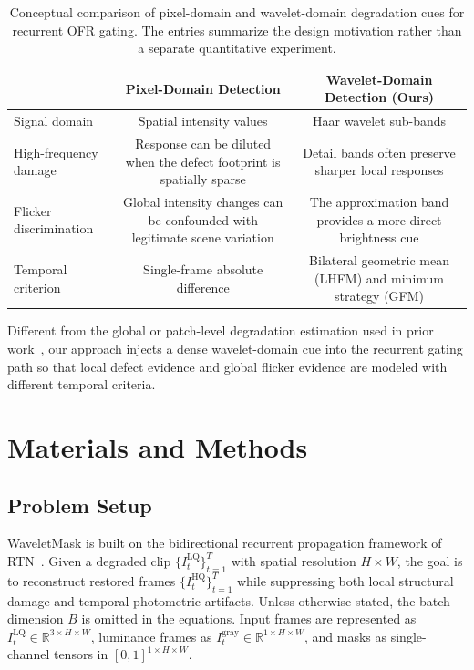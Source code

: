 \documentclass[applsci,article,submit,pdftex,moreauthors]{Definitions/mdpi}
\begin{document}
\begin{table}[H]
\caption{Conceptual comparison of pixel-domain and wavelet-domain degradation cues for recurrent OFR gating. The entries summarize the design motivation rather than a separate quantitative experiment.\label{tab:feature_comparison}}
\begin{tabularx}{\textwidth}{lCC}
\toprule
& \textbf{Pixel-Domain Detection} & \textbf{Wavelet-Domain Detection (Ours)} \\
\midrule
Signal domain          & Spatial intensity values & Haar wavelet sub-bands \\
High-frequency damage  & Response can be diluted when the defect footprint is spatially sparse & Detail bands often preserve sharper local responses \\
Flicker discrimination & Global intensity changes can be confounded with legitimate scene variation & The approximation band provides a more direct brightness cue \\
Temporal criterion     & Single-frame absolute difference & Bilateral geometric mean (LHFM) and minimum strategy (GFM) \\
\bottomrule
\end{tabularx}
\end{table}

Different from the global or patch-level degradation estimation used in prior work~\cite{li2022airnet,potlapalli2023promptir,mao2025mambaofr}, our approach injects a dense wavelet-domain cue into the recurrent gating path so that local defect evidence and global flicker evidence are modeled with different temporal criteria.

\section{Materials and Methods}\label{sec:method}

\subsection{Problem Setup}\label{subsec:problem_setup}

WaveletMask is built on the bidirectional recurrent propagation framework of RTN~\cite{rtn2022}. Given a degraded clip $\{I_t^{\mathrm{LQ}}\}_{t=1}^{T}$ with spatial resolution $H\times W$, the goal is to reconstruct restored frames $\{I_t^{\mathrm{HQ}}\}_{t=1}^{T}$ while suppressing both local structural damage and temporal photometric artifacts. Unless otherwise stated, the batch dimension $B$ is omitted in the equations. Input frames are represented as $I_t^{\mathrm{LQ}}\in\mathbb{R}^{3\times H\times W}$, luminance frames as $I_t^{\mathrm{gray}}\in\mathbb{R}^{1\times H\times W}$, and masks as single-channel tensors in $[0,1]^{1\times H\times W}$.
\end{document}
